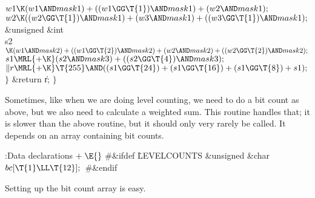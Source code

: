 ${}\\{w1}\K(\\{w1}\AND\\{mask1})+((\\{w1}\GG\T{1})\AND\\{mask1})+(\\{w2}\AND%
\\{mask1});{}$\6
${}\\{w2}\K((\\{w2}\GG\T{1})\AND\\{mask1})+(\\{w3}\AND\\{mask1})+((\\{w3}\GG%
\T{1})\AND\\{mask1});{}$\7
\&{unsigned} \&{int} \\{s2}${}\K(\\{w1}\AND\\{mask2})+((\\{w1}\GG\T{2})\AND%
\\{mask2})+(\\{w2}\AND\\{mask2})+((\\{w2}\GG\T{2})\AND\\{mask2});{}$\7
${}\\{s1}\MRL{+{\K}}(\\{s2}\AND\\{mask3})+((\\{s2}\GG\T{4})\AND\\{mask3});{}$\6
${}\|r\MRL{+{\K}}\T{255}\AND((\\{s1}\GG\T{24})+(\\{s1}\GG\T{16})+(\\{s1}\GG%
\T{8})+\\{s1});{}$\6
\4${}\}{}$\2\6
\&{return} \|r;\6
\4${}\}{}$\2\par
\fi

Sometimes, like when we are doing level counting, we need to
do a bit count as above, but we also need to calculate a weighted
sum.  This routine handles that; it is slower than the above
routine, but it should only very rarely be called.  It depends
on an array containing bit counts.

\Y\B\4:Data declarations\X${}\mathrel+\E{}$\6
\8\#\&{ifdef} \.{LEVELCOUNTS}\6
\&{unsigned} \&{char} ${}\\{bc}[\T{1}\LL\T{12}];{}$\6
\8\#\&{endif}\par
\fi

Setting up the bit count array is easy.

